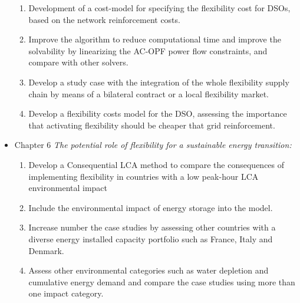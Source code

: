 \begin{itemize}
\begin{enumerate}
		\item Development of a cost-model for specifying the flexibility cost for DSOs, based on the network reinforcement costs. 
		\item Improve the algorithm to reduce computational time and improve the solvability by linearizing the AC-OPF power flow constraints, and compare with other solvers. 
		\item Develop a study case with the integration of the whole flexibility supply chain by means of a bilateral contract or a local flexibility market. 
		\item Develop a flexibility costs model for the DSO, assessing the importance that activating flexibility should be cheaper that grid reinforcement. 
	\end{enumerate}
\item Chapter 6 \textit{The potential role of flexibility for a sustainable energy transition:} 
	\begin{enumerate}
		\item Develop a Consequential LCA method to compare the consequences of implementing flexibility in countries with a low peak-hour LCA environmental impact
		\item Include the environmental impact of energy storage into the model. 
		\item Increase number the case studies by assessing other countries with a diverse energy installed capacity portfolio such as France, Italy and Denmark. 
		\item Assess other environmental categories such as water depletion and cumulative energy demand and compare the case studies using more than one impact category. 
	\end{enumerate}
\end{itemize}
